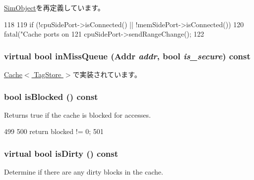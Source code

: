 \hyperlink{classSimObject_a02fd73d861ef2e4aabb38c0c9ff82947}{SimObject}を再定義しています。


\begin{DoxyCode}
118 {
119     if (!cpuSidePort->isConnected() || !memSidePort->isConnected())
120         fatal("Cache ports on %
121     cpuSidePort->sendRangeChange();
122 }
\end{DoxyCode}
\hypertarget{classBaseCache_abb47bf01a0bb0aa1c4e3d60fc2ca8175}{
\subsubsection[{inMissQueue}]{\setlength{\rightskip}{0pt plus 5cm}virtual bool inMissQueue ({\bf Addr} {\em addr}, \/  bool {\em is\_\-secure}) const}}
\label{classBaseCache_abb47bf01a0bb0aa1c4e3d60fc2ca8175}


\hyperlink{classCache_a01f08168ad1a2fee8ccff0f562da70de}{Cache$<$ TagStore $>$}で実装されています。\hypertarget{classBaseCache_a798c4be15789e723465215258f41c29b}{
\subsubsection[{isBlocked}]{\setlength{\rightskip}{0pt plus 5cm}bool isBlocked () const}}
\label{classBaseCache_a798c4be15789e723465215258f41c29b}
Returns true if the cache is blocked for accesses. 


\begin{DoxyCode}
499     {
500         return blocked != 0;
501     }
\end{DoxyCode}
\hypertarget{classBaseCache_a373dc1334f26db2ba94e827f3c9adc83}{
\subsubsection[{isDirty}]{\setlength{\rightskip}{0pt plus 5cm}virtual bool isDirty () const}}
\label{classBaseCache_a373dc1334f26db2ba94e827f3c9adc83}
Determine if there are any dirty blocks in the cache.

